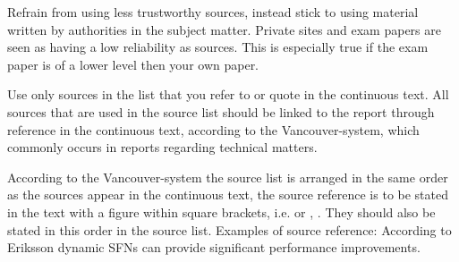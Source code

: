 Refrain from using less trustworthy sources, instead stick to using material written by authorities in the subject matter. Private sites and exam papers are seen as having a low reliability as sources. This is especially true if the exam paper is of a lower level then your own paper.

Use only sources in the list that you refer to or quote in the continuous text. All sources that are used in the source list should be linked to the report through reference in the continuous text, according to the Vancouver-system, which commonly occurs in reports regarding technical matters.

According to the Vancouver-system the source list is arranged in the same order as the sources appear in the continuous text, the source reference is to be stated in the text with a figure within square brackets, i.e. \cite{dataterm-kth} or \cite{eriksson-2001}, \cite{stomquist}. They should also be stated in this order in the source list. Examples of source reference: According to Eriksson \cite{eriksson-2001}  dynamic SFNs can provide significant performance improvements.
\fi
